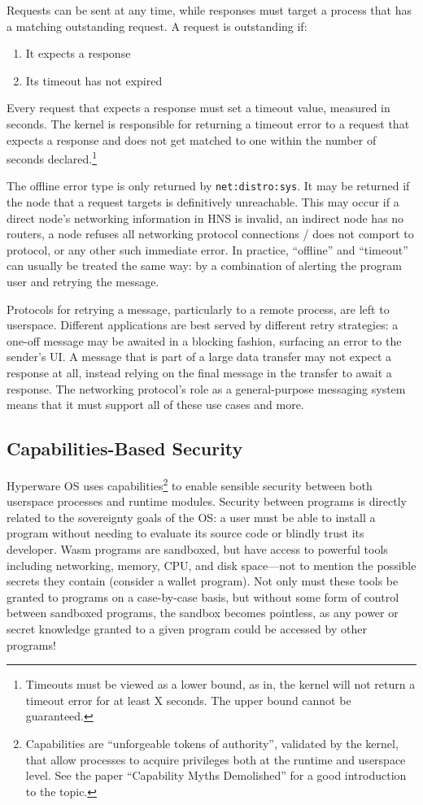 \documentclass[runningheads]{llncs}
\begin{document}
Requests can be sent at any time, while responses must target a process that has a matching outstanding request.
A request is outstanding if:
\begin{enumerate}
    \item It expects a response
    \item Its timeout has not expired
\end{enumerate}
Every request that expects a response must set a timeout value, measured in seconds.
The kernel is responsible for returning a timeout error to a request that expects a response and does not get matched to one within the number of seconds declared.\footnote{Timeouts must be viewed as a lower bound, as in, the kernel will not return a timeout error for at least X seconds. The upper bound cannot be guaranteed.}

The offline error type is only returned by \verb|net:distro:sys|.
It may be returned if the node that a request targets is definitively unreachable.
This may occur if a direct node's networking information in HNS is invalid, an indirect node has no routers, a node refuses all networking protocol connections / does not comport to protocol, or any other such immediate error.
In practice, ``offline'' and ``timeout'' can usually be treated the same way: by a combination of alerting the program user and retrying the message.

Protocols for retrying a message, particularly to a remote process, are left to userspace.
Different applications are best served by different retry strategies:
a one-off message may be awaited in a blocking fashion, surfacing an error to the sender's UI.
A message that is part of a large data transfer may not expect a response at all, instead relying on the final message in the transfer to await a response.
The networking protocol's role as a general-purpose messaging system means that it must support all of these use cases and more.

\subsection{Capabilities-Based Security}
\label{sec:oscapabilities}

Hyperware OS uses capabilities\footnote{Capabilities are ``unforgeable tokens of authority'', validated by the kernel, that allow processes to acquire privileges both at the runtime and userspace level.
See the paper ``Capability Myths Demolished'' for a good introduction to the topic.}
to enable sensible security between both userspace processes and runtime modules.
Security between programs is directly related to the sovereignty goals of the OS: a user must be able to install a program without needing to evaluate its source code or blindly trust its developer.
Wasm programs are sandboxed, but have access to powerful tools including networking, memory, CPU, and disk space—not to mention the possible secrets they contain (consider a wallet program).
Not only must these tools be granted to programs on a case-by-case basis, but without some form of control between sandboxed programs, the sandbox becomes pointless, as any power or secret knowledge granted to a given program could be accessed by other programs!
\end{document}
